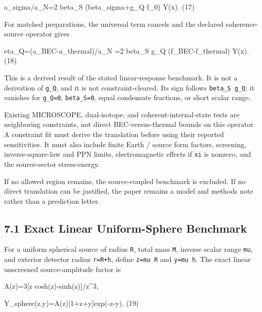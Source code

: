 \documentclass[
  american,
  11pt,
  letterpaper,
]{article}
\newenvironment{Shaded}{}{}
\newcommand{\NormalTok}[1]{#1}
\begin{document}
\begin{Shaded}
\begin{Highlighting}[]
\NormalTok{a\_sigma/a\_N=2 beta\_S (beta\_sigma+g\_Q f\_0) Y(x).                 (17)}
\end{Highlighting}
\end{Shaded}

For matched preparations, the universal term cancels and the declared coherence-source operator gives

\begin{Shaded}
\begin{Highlighting}[]
\NormalTok{eta\_Q=(a\_BEC{-}a\_thermal)/a\_N}
\NormalTok{     =2 beta\_S g\_Q (f\_BEC{-}f\_thermal) Y(x).                      (18)}
\end{Highlighting}
\end{Shaded}

This is a derived result of the stated linear-response benchmark. It is not a derivation of \texttt{g\_Q}, and it is not constraint-cleared. Its sign follows \texttt{beta\_S\ g\_Q}; it vanishes for \texttt{g\_Q=0}, \texttt{beta\_S=0}, equal condensate fractions, or short scalar range.

Existing MICROSCOPE, dual-isotope, and coherent-internal-state tests are neighboring constraints, not direct BEC-versus-thermal bounds on this operator. A constraint fit must derive the translation before using their reported sensitivities. It must also include finite Earth / source form factors, screening, inverse-square-law and PPN limits, electromagnetic effects if \texttt{xi} is nonzero, and the source-sector stress-energy.

If no allowed region remains, the source-coupled benchmark is excluded. If no direct translation can be justified, the paper remains a model and methods note rather than a prediction letter.

\subsection{7.1 Exact Linear Uniform-Sphere Benchmark}\label{exact-linear-uniform-sphere-benchmark}

For a uniform spherical source of radius \texttt{R}, total mass \texttt{M}, inverse scalar range \texttt{mu}, and exterior detector radius \texttt{r=R+h}, define \texttt{z=mu\ R} and \texttt{y=mu\ h}. The exact linear unscreened source-amplitude factor is

\begin{Shaded}
\begin{Highlighting}[]
\NormalTok{A(z)=3[z cosh(z){-}sinh(z)]/z\^{}3,}

\NormalTok{Y\_sphere(z,y)=A(z)[1+z+y]exp({-}z{-}y).                             (19)}
\end{Highlighting}
\end{Shaded}
\end{document}
